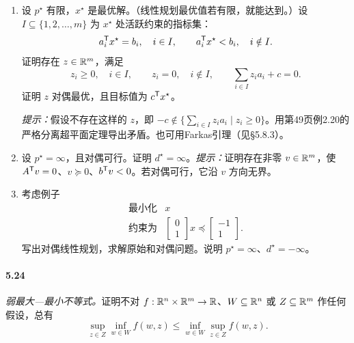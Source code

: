 \begin{enumerate}[label=(\alph*)]
\item 设 $p^\star$ 有限，$x^\star$ 是最优解。（线性规划最优值若有限，就能达到。）设 $I\subseteq\{1,2,\ldots,m\}$ 为 $x^\star$ 处活跃约束的指标集：
\[
a_i^\mathsf T x^\star=b_i,\quad i\in I,\qquad
a_i^\mathsf T x^\star<b_i,\quad i\notin I.
\]
证明存在 $z\in\mathbb R^m$，满足
\[
z_i\ge0,\quad i\in I,\qquad z_i=0,\quad i\notin I,\qquad
\sum_{i\in I}z_i a_i+c=0.
\]
证明 $z$ 对偶最优，且目标值为 $c^\mathsf T x^\star$。

\emph{提示：}假设不存在这样的 $z$，即
$-c\notin\{\sum_{i\in I}z_i a_i\mid z_i\ge0\}$。用第49页例2.20的严格分离超平面定理导出矛盾。也可用Farkas引理（见§5.8.3）。
\item 设 $p^\star=\infty$，且对偶可行。证明 $d^\star=\infty$。\emph{提示：}证明存在非零 $v\in\mathbb R^m$，使 $A^\mathsf T v=0$、$v\succeq0$、$b^\mathsf T v<0$。若对偶可行，它沿 $v$ 方向无界。
\item 考虑例子
\[
\begin{array}{ll}\text{最小化}&x\\
\text{约束为}&\begin{bmatrix}0\\1\end{bmatrix}x
\preceq\begin{bmatrix}-1\\1\end{bmatrix}.\end{array}
\]
写出对偶线性规划，求解原始和对偶问题。说明 $p^\star=\infty$、$d^\star=-\infty$。
\end{enumerate}

\paragraph{5.24} \emph{弱最大—最小不等式。}证明不对 $f:\mathbb R^n\times\mathbb R^m\to\mathbb R$、$W\subseteq\mathbb R^n$ 或 $Z\subseteq\mathbb R^m$ 作任何假设，总有
\[
\sup_{z\in Z}\inf_{w\in W}f(w,z)
\le\inf_{w\in W}\sup_{z\in Z}f(w,z).
\]

